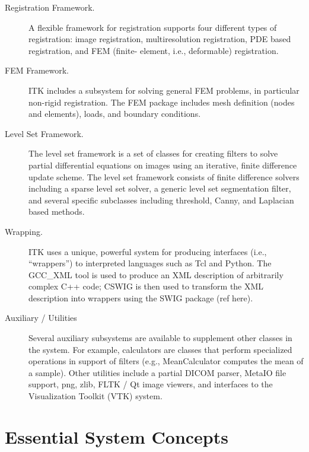 \begin{description}
	\item[Registration Framework.] A flexible framework for registration
        supports four different types of registration: image registration,
        multiresolution registration, PDE based registration, and FEM (finite-
        element, i.e., deformable) registration.

	\item[FEM Framework.] ITK includes a subsystem for solving general
        FEM problems, in particular non-rigid registration. The FEM package
        includes mesh definition (nodes and elements), loads, and boundary
        conditions.

	\item[Level Set Framework.] The level set framework is a set of
        classes for creating filters to solve partial differential equations
        on images using an iterative, finite difference update scheme. The
        level set framework consists of finite difference solvers including a
        sparse level set solver, a generic level set segmentation filter, and
        several specific subclasses including threshold, Canny, and Laplacian
        based methods.

	\item[Wrapping.] ITK uses a unique, powerful system for producing
        interfaces (i.e., ``wrappers'') to interpreted languages such as Tcl
        and Python. The GCC\_XML tool is used to produce an XML description of
        arbitrarily complex C++ code; CSWIG is then used to transform the XML
        description into wrappers using the SWIG package (ref here).

	\item[Auxiliary / Utilities] Several auxiliary subsystems are 
        available to supplement other classes in the system. For example,
        calculators are classes that perform specialized operations in
        support of filters (e.g., MeanCalculator computes the mean of a
        sample). Other utilities include a partial DICOM parser, MetaIO file
        support, png, zlib, FLTK / Qt image viewers, and interfaces to the
        Visualization Toolkit (VTK) system.
        
\end{description}


\section{Essential System Concepts}
\label{sec:EssentialSystemConcepts}

